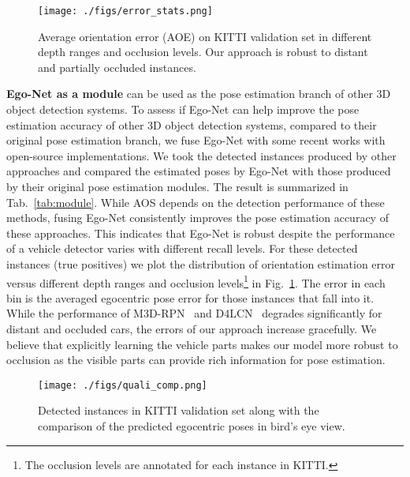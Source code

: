 \documentclass[final]{cvpr}
\begin{document}
\begin{figure}
	\begin{center}
		\texttt{[image: ./figs/error\_stats.png]}
	\end{center}
	\caption{Average orientation error (AOE) on KITTI validation set in different depth ranges and occlusion levels. Our approach is robust to distant and partially occluded instances.}
	\label{fig:aoe}
\end{figure}

\noindent \textbf{Ego-Net as a module} can be used as the pose estimation branch of other 3D object detection systems. To assess if Ego-Net can help improve the pose estimation accuracy of other 3D object detection systems, compared to their original pose estimation branch, we fuse Ego-Net with some recent works with open-source implementations. We took the detected instances produced by other approaches and compared the estimated poses by Ego-Net with those produced by their original pose estimation modules. The result is summarized in Tab.~\ref{tab:module}. While AOS depends on the detection performance of these methods, fusing Ego-Net consistently improves the pose estimation accuracy of these approaches. This indicates that Ego-Net is robust despite the performance of a vehicle detector varies with different recall levels. For these detected instances (true positives) we plot the distribution of orientation estimation error versus different depth ranges and occlusion levels\footnote{The occlusion levels are annotated for each instance in KITTI.} in Fig.~\ref{fig:aoe}. The error in each bin is the averaged egocentric pose error for those instances that fall into it. While the performance of M3D-RPN~\cite{brazil2019m3d} and D4LCN~\cite{Ding_2020_CVPR} degrades significantly for distant and occluded cars, the errors of our approach increase gracefully. We believe that explicitly learning the vehicle parts makes our model more robust to occlusion as the visible parts can provide rich information for pose estimation.

\begin{figure}
	\begin{center}
		\texttt{[image: ./figs/quali\_comp.png]}
	\end{center}
	\caption{Detected instances in KITTI validation set along with the comparison of the predicted egocentric poses in bird's eye view.}
	\label{fig:quali_comp}
\end{figure}
\end{document}
